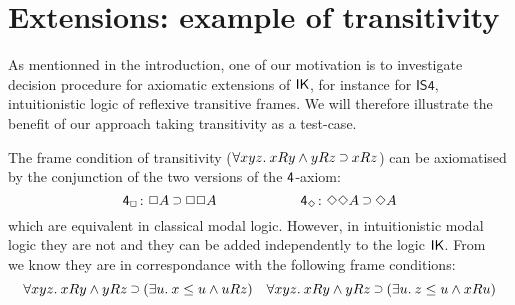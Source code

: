 \documentclass[twoside]{aiml20}
\begin{document}

\section{Extensions: example of transitivity}\label{sec:extensions}

As mentionned in the introduction, one of our motivation is to investigate decision procedure for axiomatic extensions of $\mathsf{IK}$, for instance for $\mathsf{IS4}$, intuitionistic logic of reflexive transitive frames.
%
We will therefore illustrate the benefit of our approach taking transitivity as a test-case.

%

The frame condition of transitivity ($\forall \lb {xyz}.\:\accs xy\AND \accs yz\IMP\accs xz$) can be axiomatised by the conjunction of the two versions of the $\mathsf{4}$-axiom:\vspace*{-.2cm}
$$
\ax{4_{\BOX}}\colon\fm{\BOX A\IMP \BOX\BOX A}
\qquad\qquad\qquad
\ax{4_{\DIA}}\colon\fm{\DIA\DIA A\IMP\DIA A}
$$%
%
which are equivalent in classical modal logic. 
%
However, in intuitionistic modal logic they are not and they can be added independently to the logic $\mathsf{IK}$. %
%
From~\cite{plotkin1986} we know they are in correspondance with the following frame conditions:\vspace*{-.2cm}
\begin{equation}
\label{eq:4frame}
\forall\lb{xyz}.\:\accs xy\AND \accs yz\IMP(\exists\lb{u}.\:\futs x{u}\AND\accs {u}z)
\quad
\forall\lb{xyz}.\:\accs xy\AND \accs yz\IMP(\exists\lb{u}.\:\futs z{u}\AND\accs {x}{u})
\end{equation}
\end{document}
